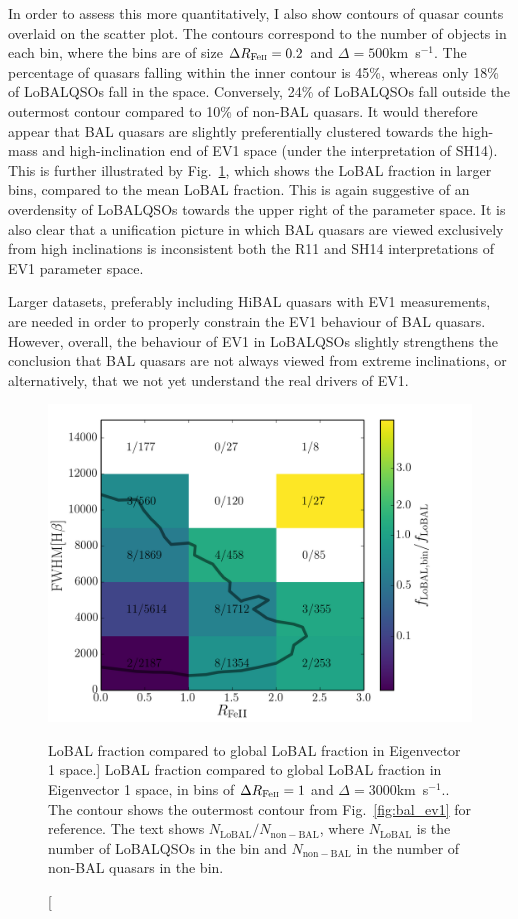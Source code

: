 In order to assess this more quantitatively, I also show contours of 
quasar counts overlaid on the scatter plot. The contours correspond
to the number of objects in each bin, where the bins are of size
$\Delta R_{{\rm Fe \textsc{ii}}} = 0.2$ and $\Delta$\fwh$=500$km~s$^{-1}$.
The percentage of quasars falling within the inner contour is 45\%, 
whereas only 18\% of LoBALQSOs fall in the space. Conversely, 24\% 
of LoBALQSOs fall outside the outermost contour compared to 10\% of 
non-BAL quasars. It would therefore appear that BAL 
quasars are slightly preferentially clustered towards the high-mass and 
high-inclination end of EV1 space (under the interpretation of SH14).
This is further illustrated by Fig.~\ref{fig:bal_ev1_bins},
which shows the LoBAL fraction in larger bins, compared to the 
mean LoBAL fraction. This is again suggestive of an overdensity of LoBALQSOs 
towards the upper right of the parameter space.
It is also clear that a unification picture in which BAL 
quasars are viewed exclusively from high inclinations is 
inconsistent both the R11 and SH14 interpretations of EV1 parameter 
space. 

Larger datasets, preferably including HiBAL quasars with EV1 measurements, 
are needed in order to properly constrain the EV1 behaviour of BAL quasars.
However, overall, the behaviour of EV1 in LoBALQSOs slightly 
strengthens the conclusion that BAL quasars are not always viewed from 
extreme inclinations, or alternatively, that we not yet understand the real drivers
of EV1.

\begin{figure}
\centering
\includegraphics[width=1.0\textwidth]{figures/ewpaper/ev1_bins.png}
\caption
[LoBAL fraction compared to global LoBAL fraction in Eigenvector 1 space.]
{
LoBAL fraction compared to global LoBAL fraction in Eigenvector 1 space, in bins
of $\Delta R_{{\rm Fe \textsc{ii}}} = 1$ and $\Delta$\fwh$=3000$km~s$^{-1}$..
The contour shows the outermost contour from Fig.~\ref{fig:bal_ev1} for
reference. The text shows $N_{\mathrm{LoBAL}}/N_{\mathrm{non-BAL}}$, 
where $N_{\mathrm{LoBAL}}$ is the number of LoBALQSOs in the bin and 
$N_{\mathrm{non-BAL}}$ in the number of non-BAL quasars in the bin.
}
\label{fig:bal_ev1_bins}
\end{figure}

